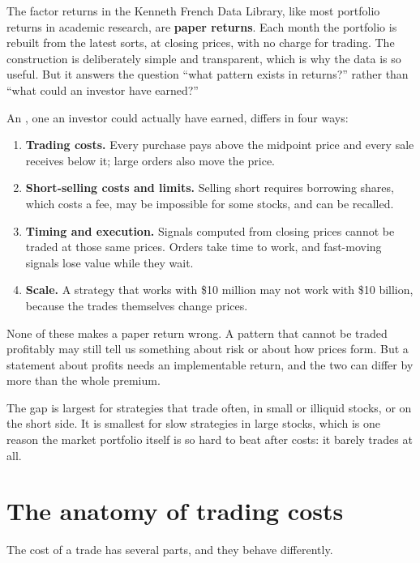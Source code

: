 The factor returns in the Kenneth French Data Library, like most portfolio returns in academic research, are \textbf{paper returns}. Each month the portfolio is rebuilt from the latest sorts, at closing prices, with no charge for trading. The construction is deliberately simple and transparent, which is why the data is so useful. But it answers the question ``what pattern exists in returns?'' rather than ``what could an investor have earned?''

An , one an investor could actually have earned, differs in four ways:

\begin{enumerate}
  \item \textbf{Trading costs.} Every purchase pays above the midpoint price and every sale receives below it; large orders also move the price.
  \item \textbf{Short-selling costs and limits.} Selling short requires borrowing shares, which costs a fee, may be impossible for some stocks, and can be recalled.
  \item \textbf{Timing and execution.} Signals computed from closing prices cannot be traded at those same prices. Orders take time to work, and fast-moving signals lose value while they wait.
  \item \textbf{Scale.} A strategy that works with \$10 million may not work with \$10 billion, because the trades themselves change prices.
\end{enumerate}

None of these makes a paper return wrong. A pattern that cannot be traded profitably may still tell us something about risk or about how prices form. But a statement about profits needs an implementable return, and the two can differ by more than the whole premium.

The gap is largest for strategies that trade often, in small or illiquid stocks, or on the short side. It is smallest for slow strategies in large stocks, which is one reason the market portfolio itself is so hard to beat after costs: it barely trades at all.

\section{The anatomy of trading costs}
\label{sec:17-anatomy}

The cost of a trade has several parts, and they behave differently.

